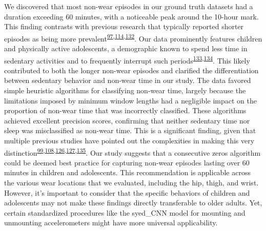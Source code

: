 \documentclass[
  10pt,
]{scrbook}
\begin{document}
We discovered that most non-wear episodes in our ground truth datasets
had a duration exceeding 60 minutes, with a noticeable peak around the
10-hour mark. This finding contrasts with previous research that
typically reported shorter episodes as being more
prevalent\textsuperscript{\protect\hyperlink{ref-aadland_comparison_2018}{97},\protect\hyperlink{ref-jaeschke_variability_2018}{114},\protect\hyperlink{ref-hutto_identifying_2013}{132}}.
Our data prominently features children and physically active
adolescents, a demographic known to spend less time in sedentary
activities and to frequently interrupt such
periods\textsuperscript{\protect\hyperlink{ref-cooper_objectively_2015}{133},\protect\hyperlink{ref-kwon_breaks_2012}{134}}.
This likely contributed to both the longer non-wear episodes and
clarified the differentiation between sedentary behavior and non-wear
time in our study. The data favored simple heuristic algorithms for
classifying non-wear time, largely because the limitations imposed by
minimum window lengths had a negligible impact on the proportion of
non-wear time that was incorrectly classified. These algorithms achieved
excellent precision scores, confirming that neither sedentary time nor
sleep was misclassified as non-wear time. This is a significant finding,
given that multiple previous studies have pointed out the complexities
in making this very
distinction\textsuperscript{\protect\hyperlink{ref-duncan_wear-time_2018}{99},\protect\hyperlink{ref-doherty_large_2017}{108},\protect\hyperlink{ref-troiano_physical_2008}{126},\protect\hyperlink{ref-choi_validation_2011}{127},\protect\hyperlink{ref-barouni_ambulatory_2020}{135}}.
Our study suggests that a consecutive zeros algorithm could be deemed
best practice for capturing non-wear episodes lasting over 60 minutes in
children and adolescents. This recommendation is applicable across the
various wear locations that we evaluated, including the hip, thigh, and
wrist. However, it's important to consider that the specific behaviors
of children and adolescents may not make these findings directly
transferable to older adults. Yet, certain standardized procedures like
the syed\_CNN model for mounting and unmounting accelerometers might
have more universal applicability.
\end{document}

